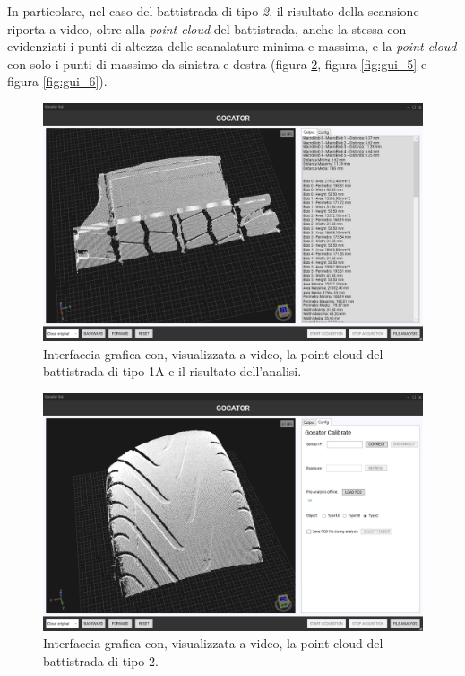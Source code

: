 \noindent In particolare, nel caso del battistrada di tipo \textit{2}, il risultato della scansione riporta a video, oltre alla \textit{point cloud} del battistrada, anche la stessa con evidenziati i punti di altezza delle scanalature minima e massima, e la \textit{point cloud} con solo i punti di massimo da sinistra e destra (figura \ref{fig:gui_4}, figura \ref{fig:gui_5} e figura \ref{fig:gui_6}).

\begin{figure}[H]
	\centering
	\includegraphics[width=0.9\columnwidth]{./pictures/gui_4.png}
	\caption{Interfaccia grafica con, visualizzata a video, la point cloud del battistrada di tipo 1A e il risultato dell'analisi.}\label{fig:gui_3}
\end{figure}

\begin{figure}[H]
	\centering
	\includegraphics[width=0.9\columnwidth]{./pictures/gui_5.png}
	\caption{Interfaccia grafica con, visualizzata a video, la point cloud del battistrada di tipo 2.}\label{fig:gui_4}
\end{figure}

